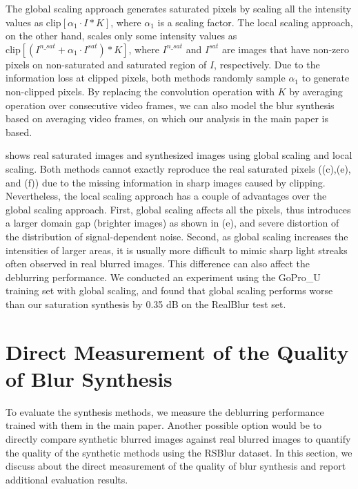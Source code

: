 The global scaling approach generates saturated pixels by scaling all the intensity values as $\textrm{clip}[\alpha_1 \cdot I * K]$, where $\alpha_1$ is a scaling factor. The local scaling approach, on the other hand, scales only some intensity values as $\textrm{clip}[(I^{n\_sat} + \alpha_1 \cdot I^{sat}) * K]$, where $I^{n\_sat}$ and $I^{sat}$ are images that have non-zero pixels on non-saturated and saturated region of $I$, respectively.
Due to the information loss at clipped pixels, both methods randomly sample $\alpha_1$ to generate non-clipped pixels.
By replacing the convolution operation with $K$ by averaging operation over consecutive video frames, we can also model the blur synthesis based on averaging video frames, on which our analysis in the main paper is based.

 shows real saturated images and synthesized images using global scaling and local scaling.
Both methods cannot exactly reproduce the real saturated pixels ((c),(e), and (f)) due to the missing information in sharp images caused by clipping. 
Nevertheless, the local scaling approach has a couple of advantages over the global scaling approach.
First, global scaling affects all the pixels, thus introduces a larger domain gap (brighter images) as shown in (e), and severe distortion of the distribution of signal-dependent noise.
Second, as global scaling increases the intensities of larger areas, it is usually more difficult to mimic sharp light streaks often observed in real blurred images.
This difference can also affect the deblurring performance.
We conducted an experiment using the GoPro\_U training set with global scaling, and found that global scaling performs worse than our saturation synthesis by 0.35 dB on the RealBlur test set.



\section{Direct Measurement of the Quality of Blur Synthesis}

To evaluate the synthesis methods, we measure the deblurring performance trained with them in the main paper.
Another possible option would be to directly compare synthetic blurred images against real blurred images to quantify the quality of the synthetic methods using the RSBlur dataset.
In this section, we discuss about the direct measurement of the quality of blur synthesis and report additional evaluation results.

